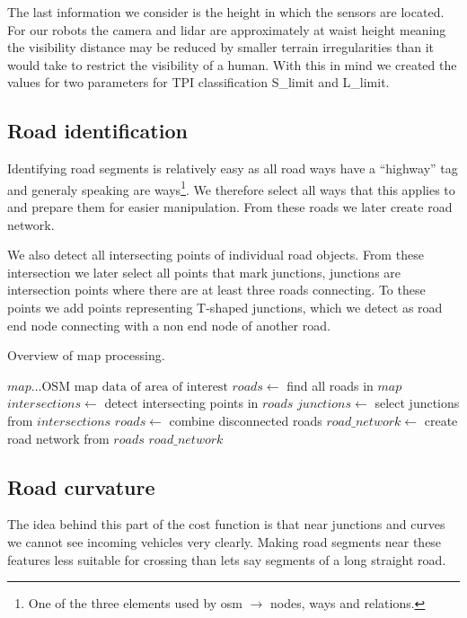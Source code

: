 \documentclass[oneside]{article}
\begin{document}
        The last information we consider is the height in which the sensors are located. For our robots the camera and lidar are approximately at waist height meaning the visibility distance may be reduced by smaller terrain irregularities than it would take to restrict the visibility of a human. With this in mind we created the values for two parameters for TPI classification S\_limit and L\_limit.

        \subsection{Road identification}
        Identifying road segments is relatively easy as all road ways have a ``highway'' tag and generaly speaking are ways\footnote{One of the three elements used by osm $\to$ nodes, ways and relations.}. We therefore select all ways that this applies to and prepare them for easier manipulation. From these roads we later create road network.
        
        We also detect all intersecting points of individual road objects. From these intersection we later select all points that mark junctions, junctions are intersection points where there are at least three roads connecting. To these points we add points representing T-shaped junctions, which we detect as road end node connecting with a non end node of another road.
        \begin{algorithm}
        \caption{Overview of map processing.}
        \begin{algorithmic}
        \Require $map \ldots \textrm{OSM map data of area of interest}$
        \State $roads \gets$ find all roads in $map$
        \State $intersections \gets$ detect intersecting points in $roads$
        \State $junctions \gets$ select junctions from $intersections$
        \State $roads \gets$ combine disconnected roads
        \State $road\_network \gets$ create road network from $roads$
        \Ensure $road\_network$
        \end{algorithmic}
        \end{algorithm}
        
        \subsection{Road curvature}
        \label{sec:rd_cur}
        The idea behind this part of the cost function is that near junctions and curves we cannot see incoming vehicles very clearly. Making road segments near these features less suitable for crossing than lets say segments of a long straight road.
\end{document}
